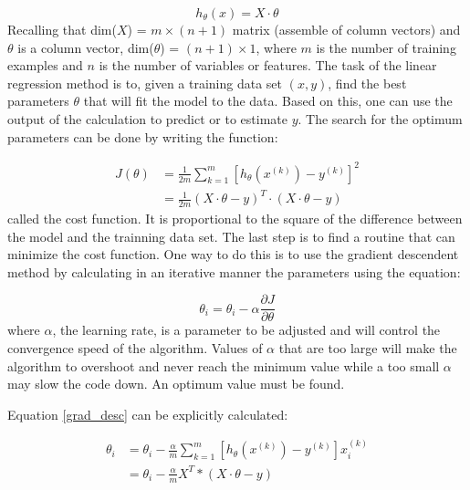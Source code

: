 \documentclass[
10pt, %
a4paper, %
oneside, %
headinclude,footinclude, %
BCOR5mm, %
]{scrartcl}
\begin{document}
\begin{equation}
    h_{\theta}(x) = X \cdot \theta
\end{equation}
Recalling that dim($X$) =  $m \times (n+1)$ matrix (assemble of column vectors) and $\theta$ is a column vector, dim($\theta$) = $(n+1) \times 1$,
where $m$ is the number of training examples and $n$ is the number of variables or features.
The task of the linear regression method is to, given a training data set $(x,y)$, find the best parameters $\theta$ that will fit the model to the data.
Based on this, one can use the output of the calculation to predict or to estimate $y$. The search for the optimum parameters can be done by writing the function:

\begin{equation}
    \begin{split}
        J(\theta) &= \frac{1}{2 m} \sum _{k=1}^{m} [ h_{\theta}(x^{(k)}) - y^{(k)}]^{2} \\
                    & = \frac{1}{2 m} (X \cdot \theta - y)^{T} \cdot (X \cdot \theta - y)
    \end{split}
\end{equation}
called the cost function. It is proportional to the square of the difference between the model and the trainning data set. 
The last step is to find a routine that can minimize the cost function. One way to do this is to use the gradient descendent 
method by calculating in an iterative manner the parameters using the equation:

\begin{equation} \label{grad_desc}
    \theta_{i} = \theta_{i} - \alpha \frac{\partial J}{\partial \theta}
\end{equation}
where $\alpha$, the learning rate, is a parameter to be adjusted and will control the convergence speed of the algorithm. 
Values of $\alpha$ that are too large will make the algorithm to overshoot and never reach the minimum
value while a too small $\alpha$ may slow the code down. An optimum value must be found.

Equation \ref{grad_desc} can be explicitly calculated:

\begin{equation}
    \begin{split}
        \theta_{i} & = \theta_{i} - \frac{\alpha}{m} \sum _{k=1}^{m} [ h_{\theta}(x^{(k)}) - y^{(k)}] x_{i}^{(k)} \\
                    & = \theta_{i} - \frac{\alpha}{m} X^{T} * (X \cdot \theta - y)
    \end{split}
\end{equation}
\end{document}
